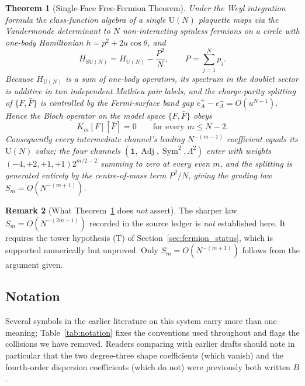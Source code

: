 \documentclass[11pt,a4paper]{article}
\newtheorem{theorem}{Theorem}[section]
\theoremstyle{definition}
\newtheorem{remark}[theorem]{Remark}
\DeclareMathOperator{\Adj}{Adj}
\DeclareMathOperator{\Sym}{Sym}
\newcommand{\SU}{\mathrm{SU}}
\newcommand{\U}{\mathrm{U}}
\begin{document}
\begin{theorem}[Single-Face Free-Fermion Theorem]\label{thm:intro_fermion}
Under the Weyl integration formula the class-function algebra of a single $\U(N)$ plaquette maps via the Vandermonde determinant to $N$ non-interacting spinless fermions on a circle with one-body Hamiltonian $h = p^2 + 2u\cos\theta$, and
\begin{equation}
  H_{\SU(N)} = H_{\U(N)} - \frac{P^2}{N}, \qquad P = \sum_{j=1}^N p_j .
\end{equation}
Because $H_{\U(N)}$ is a sum of one-body operators, its spectrum in the doublet sector is additive in two independent Mathieu pair labels, and the charge-parity splitting of $\{F,\bar F\}$ is controlled by the Fermi-surface band gap $e_A^+ - e_A^- = O(u^{N-1})$. Hence the Bloch operator on the model space $\{F,\bar F\}$ obeys
\begin{equation}
  K_m[F][\bar F] = 0 \qquad \text{for every } m \le N-2 .
\end{equation}
Consequently every intermediate channel's leading $N^{-(m-1)}$ coefficient equals its $\U(N)$ value; the four channels $(\mathbf{1},\Adj,\Sym^2,\Lambda^2)$ enter with weights $(-4,+2,+1,+1)2^{m/2-2}$ summing to zero at every even $m$, and the splitting is generated entirely by the centre-of-mass term $P^2/N$, giving the grading law $S_m = O(N^{-(m+1)})$.
\end{theorem}

\begin{remark}[What Theorem~\ref{thm:intro_fermion} does \emph{not} assert]\label{rem:intro_fermion_scope}
The sharper law $S_m = O(N^{-(2m-1)})$ recorded in the source ledger is \emph{not} established here. It requires the tower hypothesis (T) of Section~\ref{sec:fermion_status}, which is supported numerically but unproved. Only $S_m = O(N^{-(m+1)})$ follows from the argument given.
\end{remark}

\subsection{Notation}\label{sec:notation}

Several symbols in the earlier literature on this system carry more than one meaning; Table~\ref{tab:notation} fixes the conventions used throughout and flags the collisions we have removed. Readers comparing with earlier drafts should note in particular that the two degree-three shape coefficients (which vanish) and the fourth-order dispersion coefficients (which do not) were previously both written $B$.
\end{document}
